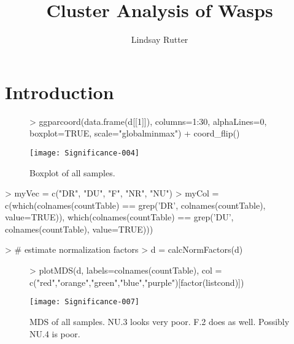 \documentclass{article}
\begin{document}


\author{Lindsay Rutter}
\title{Cluster Analysis of Wasps}

\maketitle

  
\section*{Introduction}



\begin{figure}[H]
\centering
\begin{Schunk}
\begin{Sinput}
> ggparcoord(data.frame(d[[1]]), columns=1:30, alphaLines=0, boxplot=TRUE, scale="globalminmax") + coord_flip()
\end{Sinput}
\end{Schunk}
\texttt{[image: Significance-004]}
\caption{Boxplot of all samples.}
\label{BoxAll}
\end{figure}

\begin{Schunk}
\begin{Sinput}
> myVec = c("DR", "DU", "F", "NR", "NU")
> myCol = c(which(colnames(countTable) == grep('DR', colnames(countTable), value=TRUE)), which(colnames(countTable) == grep('DU', colnames(countTable), value=TRUE)))
\end{Sinput}
\end{Schunk}


\begin{Schunk}
\begin{Sinput}
> # estimate normalization factors
> d = calcNormFactors(d)
\end{Sinput}
\end{Schunk}

\begin{figure}[H]
\centering
\begin{Schunk}
\begin{Sinput}
> plotMDS(d, labels=colnames(countTable), col = c("red","orange","green","blue","purple")[factor(listcond)])
\end{Sinput}
\end{Schunk}
\texttt{[image: Significance-007]}
\caption{MDS of all samples. NU.3 looks very poor. F.2 does as well. Possibly NU.4 is poor.}
\label{plotMDS}
\end{figure}
\end{document}
